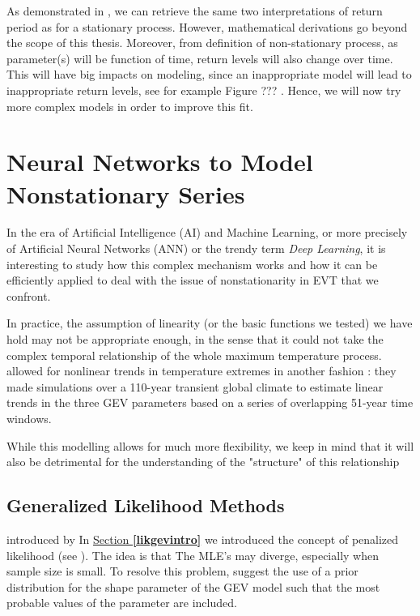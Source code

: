 As demonstrated in \citet[Section 4.2]{ag_extremes_2013}, we can retrieve the same two interpretations of return period as for a stationary process. However, mathematical derivations go beyond the scope of this thesis. Moreover, from definition of non-stationary process, as parameter(s) will be function of time, return levels will also change over time. This will have big impacts on modeling, since an inappropriate model will lead to inappropriate return levels, see for example Figure ??? . 
Hence, we will now try more complex models in order to improve this fit. 


\section{Neural Networks to Model Nonstationary Series}

In the era of Artificial Intelligence (AI) and Machine Learning, or more precisely of Artificial Neural Networks (ANN) or the trendy term \textit{Deep Learning}, it is interesting to study how this complex mechanism works and how it can be efficiently applied to deal with the issue of nonstationarity in EVT that we confront.


In practice, the assumption of linearity (or the basic functions we  tested) we have hold may not be appropriate enough, in the sense that it could not take the complex temporal relationship of the whole maximum temperature process. \citet{kharin_estimating_2005-1} allowed for nonlinear trends in temperature extremes in another fashion : they made simulations over a 110-year transient global climate to estimate linear trends in the three GEV parameters based on a series of overlapping 51-year time windows.

While this modelling allows for much more flexibility, we keep in mind that it will also be detrimental for the understanding of the "structure" of this relationship

\subsection{Generalized Likelihood Methods}
introduced by \citet{martin_generalized_2000}
In \hyperref[likgevintro]{Section \textbf{\ref{likgevintro}}} we introduced the concept of penalized likelihood (see \citet{coles_likelihood-based_1999}). The idea is that The MLE's may diverge, especially when sample size is small. To resolve this problem, suggest the use of a prior distribution for the shape parameter of the GEV model such
that the most probable values of the parameter are included.


